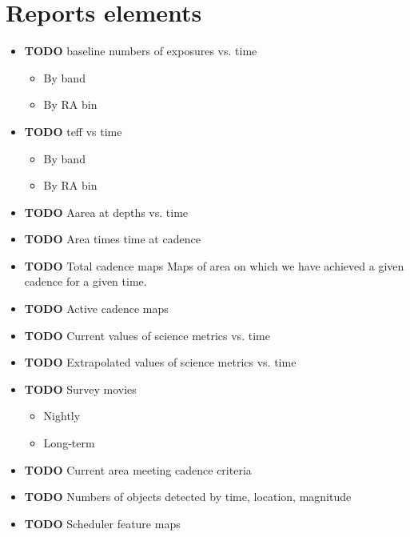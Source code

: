 \section{Reports elements}
\label{sec:orge217a3f}
\begin{itemize}
\item {\bfseries\sffamily TODO} baseline numbers of exposures vs. time
\label{sec:orgc23e3cb}
\begin{itemize}
\item By band
\label{sec:org71eb504}
\item By RA bin
\label{sec:org237d807}
\end{itemize}
\item {\bfseries\sffamily TODO} teff vs time
\label{sec:org5de68a2}
\begin{itemize}
\item By band
\label{sec:orgc93d7e6}
\item By RA bin
\label{sec:org7f96b69}
\end{itemize}
\item {\bfseries\sffamily TODO} Aarea at depths vs. time
\label{sec:org55a1f09}
\item {\bfseries\sffamily TODO} Area times time at cadence
\label{sec:org637716f}
\item {\bfseries\sffamily TODO} Total cadence maps
\label{sec:orgb20326a}
Maps of area on which we have achieved a given cadence for a given time.
\item {\bfseries\sffamily TODO} Active cadence maps
\label{sec:org4a62b37}
\item {\bfseries\sffamily TODO} Current values of science metrics vs. time
\label{sec:org0d2156e}
\item {\bfseries\sffamily TODO} Extrapolated values of science metrics vs. time
\label{sec:org675d9e0}
\item {\bfseries\sffamily TODO} Survey movies
\label{sec:org287ab77}
\begin{itemize}
\item Nightly
\label{sec:orgd5cc369}
\item Long-term
\label{sec:org2bfda51}
\end{itemize}
\item {\bfseries\sffamily TODO} Current area meeting cadence criteria
\label{sec:orgc60285e}
\item {\bfseries\sffamily TODO} Numbers of objects detected by time, location, magnitude
\label{sec:org76f57a5}
\item {\bfseries\sffamily TODO} Scheduler feature maps

\end{itemize}
